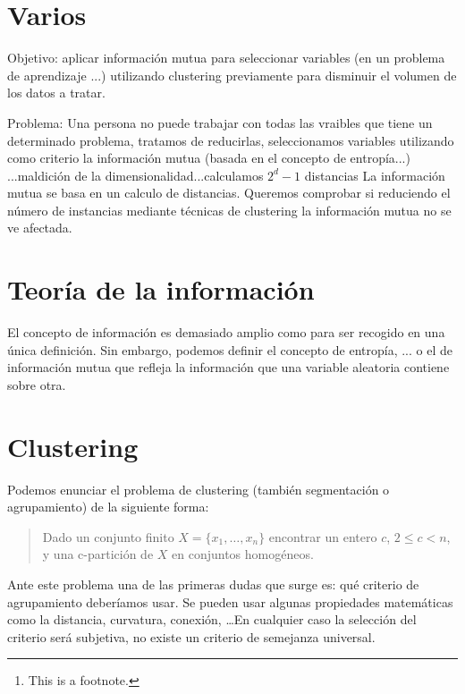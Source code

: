 \documentclass[10pt,a4paper]{article} %
\begin{document}
    \pagestyle{plain}
    \title{\rmfamily\normalfont{}}
    \author{}
    \date{} %

    \maketitle

    \begin{abstract}
        \noindent\lipsum[1] Just a test.\footnote{This is a footnote.}
    \end{abstract}

    \tableofcontents

    \section{Varios}
    Objetivo: aplicar información mutua para seleccionar variables (en un problema de aprendizaje ...) utilizando clustering previamente para disminuir el volumen de los datos a tratar.

    Problema: Una persona no puede trabajar con todas las vraibles que tiene un determinado problema, tratamos de reducirlas, seleccionamos variables utilizando como criterio la información mutua (basada en el concepto de entropía...)
    ...maldición de la dimensionalidad...calculamos $2^d-1$ distancias
    La información mutua se basa en un calculo de distancias. Queremos comprobar si reduciendo el número de instancias mediante técnicas de clustering la información mutua no se ve afectada.
     
    \section{Teoría de la información}

    El concepto de información es demasiado amplio como para ser recogido en una única definición. Sin embargo, podemos definir el concepto de entropía, ... o el de información mutua que refleja la información que una variable aleatoria contiene sobre otra.

    \section{Clustering}
    Podemos enunciar el problema de clustering (también segmentación o agrupamiento) de la siguiente forma:
    \begin{quote}
      Dado un conjunto finito $X=\{x_1,\dots,x_n\}$ encontrar un entero $c$, $2 \leq c < n$, y una c-partición de $X$ en conjuntos homogéneos.
    \end{quote}
    Ante este problema una de las primeras dudas que surge es: qué criterio de agrupamiento deberíamos usar. Se pueden usar algunas propiedades matemáticas como la distancia, curvatura, conexión, \dots  En cualquier caso la selección del criterio será subjetiva, no existe un criterio de semejanza universal.
    
\end{document}
